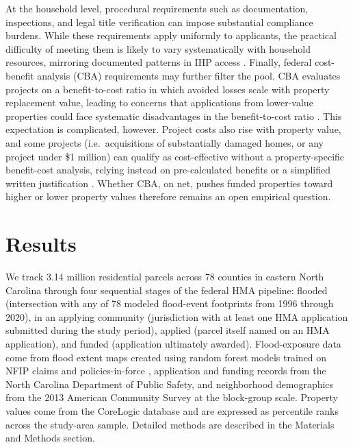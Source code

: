 \documentclass[
  authoryear,
  preprint]{elsarticle}
\begin{document}
At the household level, procedural requirements such as documentation,
inspections, and legal title verification can impose substantial
compliance burdens. While these requirements apply uniformly to
applicants, the practical difficulty of meeting them is likely to vary
systematically with household resources, mirroring documented patterns
in IHP access
\citep{riveraProceduralVulnerabilityIts2022, rakerStratifyingDisasterState2023}.
Finally, federal cost-benefit analysis (CBA) requirements may further
filter the pool. CBA evaluates projects on a benefit-to-cost ratio in
which avoided losses scale with property replacement value, leading to
concerns that applications from lower-value properties could face
systematic disadvantages in the benefit-to-cost ratio
\citep{tateFloodExposureSocial2021, junodEquitableInvestmentsResilience2021a, millerCostCostEffectivenessExpanding2023}.
This expectation is complicated, however. Project costs also rise with
property value, and some projects (i.e.~acquisitions of substantially
damaged homes, or any project under \$1 million) can qualify as
cost-effective without a property-specific benefit-cost analysis,
relying instead on pre-calculated benefits or a simplified written
justification
\citep{femaHMAProgramPolicyGuide2024, femaBCAStreamlined2024}. Whether
CBA, on net, pushes funded properties toward higher or lower property
values therefore remains an open empirical question.

\section{Results}\label{results}

We track 3.14 million residential parcels across 78 counties in eastern
North Carolina through four sequential stages of the federal HMA
pipeline: flooded (intersection with any of 78 modeled flood-event
footprints from 1996 through 2020), in an applying community
(jurisdiction with at least one HMA application submitted during the
study period), applied (parcel itself named on an HMA application), and
funded (application ultimately awarded). Flood-exposure data come from
flood extent maps created using random forest models trained on NFIP
claims and policies-in-force
\citep{garciaReconstructingRepetitiveFlood2025}, application and funding
records from the North Carolina Department of Public Safety, and
neighborhood demographics from the 2013 American Community Survey at the
block-group scale. Property values come from the CoreLogic database and
are expressed as percentile ranks across the study-area sample. Detailed
methods are described in the Materials and Methods section.
\end{document}
